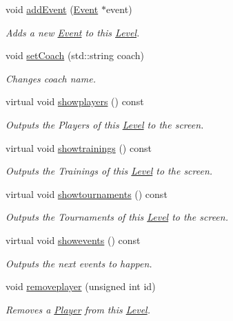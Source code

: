 \begin{DoxyCompactItemize}
void \hyperlink{class_level_a86b0d3ec7bb14fd7002c332b328dd96d}{add\+Event} (\hyperlink{class_event}{Event} $\ast$event)
\begin{DoxyCompactList}\small\item\em Adds a new \hyperlink{class_event}{Event} to this \hyperlink{class_level}{Level}. \end{DoxyCompactList}\item 
void \hyperlink{class_level_aa666e5fe87af336fd7350ac0b72b7c8c}{set\+Coach} (std\+::string coach)
\begin{DoxyCompactList}\small\item\em Changes coach name. \end{DoxyCompactList}\item 
virtual void \hyperlink{class_level_a40d22b376e72950a07de5e0a9e288029}{showplayers} () const
\begin{DoxyCompactList}\small\item\em Outputs the Players of this \hyperlink{class_level}{Level} to the screen. \end{DoxyCompactList}\item 
virtual void \hyperlink{class_level_a4101cb725b1fd0c0836834c92b190363}{showtrainings} () const
\begin{DoxyCompactList}\small\item\em Outputs the Trainings of this \hyperlink{class_level}{Level} to the screen. \end{DoxyCompactList}\item 
virtual void \hyperlink{class_level_a757c4547f3b8f7c7ecb02c7e0e6cd7c9}{showtournaments} () const
\begin{DoxyCompactList}\small\item\em Outputs the Tournaments of this \hyperlink{class_level}{Level} to the screen. \end{DoxyCompactList}\item 
virtual void \hyperlink{class_level_a8115b8f2e69ce1fdc21c64525c61a957}{showevents} () const
\begin{DoxyCompactList}\small\item\em Outputs the next events to happen. \end{DoxyCompactList}\item 
void \hyperlink{class_level_a68ca29bc1f8796b8ee89f6d9a77b3e2a}{removeplayer} (unsigned int id)
\begin{DoxyCompactList}\small\item\em Removes a \hyperlink{class_player}{Player} from this \hyperlink{class_level}{Level}. \end{DoxyCompactList}\item 

\end{DoxyCompactItemize}
